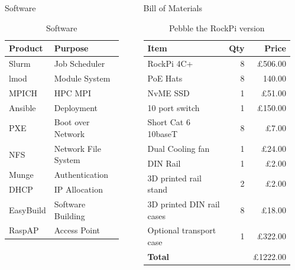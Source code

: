 \documentclass[final]{beamer}
\begin{document}
\begin{frame}[t]
\begin{columns}
\begin{column}{0.33\paperwidth}
\begin{block}{Software}
\begin{table}
						\parbox{.33\linewidth}{
							\centering
							\caption{Software}				
							\begin{tabular}{l|l}
								\textbf{Product} & {Purpose}\\
								\hline
								Slurm & Job Scheduler \\
								lmod & Module System \\
								MPICH & HPC MPI \\
								Ansible & Deployment \\
								PXE & Boot over Network \\
								NFS & Network File System \\
								Munge & Authentication \\
								DHCP & IP Allocation \\
								EasyBuild & Software Building \\
								RaspAP & Access Point \\
							\end{tabular}
						}
					\end{table}
				\end{block}
			\end{column}
			\begin{column}{0.025\paperwidth}\end{column}
			\begin{column}{0.33\paperwidth}
				\begin{block}{Bill of Materials}
					\begin{table}
						\parbox{.33\linewidth}{
							\centering
							\caption{Pebble the RockPi version}				
							\begin{tabular}{l|r|r}
								\textbf{Item} & \textbf{Qty} & \textbf{Price} \\
								\hline
								RockPi 4C+ & 8 & £506.00\\
								PoE Hats & 8 & 140.00 \\
								NvME SSD & 1 & £51.00 \\
								10 port switch & 1 & £150.00 \\
								Short Cat 6 10baseT & 8 & £7.00\\
								Dual Cooling fan & 1 & £24.00 \\
								DIN Rail & 1 & £2.00 \\
								3D printed rail stand & 2 & £2.00 \\
								3D printed DIN rail cases & 8 & £18.00 \\
								Optional transport case & 1 & £322.00 \\
								\hline
								\textbf{Total} &  & £1222.00 \\
							\end{tabular}
						}
					\end{table}
				\end{block}
			\end{column}
			\begin{column}{0.025\paperwidth}\end{column}
		\end{columns}
	\end{frame}
	
\end{document}
